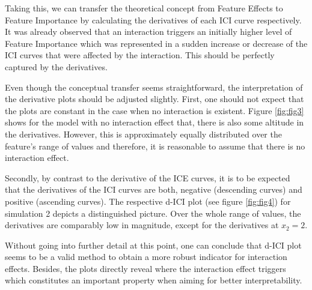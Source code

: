 \documentclass[
]{krantz}
\begin{document}
Taking this, we can transfer the theoretical concept from Feature Effects to Feature Importance by calculating the derivatives of each ICI curve respectively. It was already observed that an interaction triggers an initially higher level of Feature Importance which was represented in a sudden increase or decrease of the ICI curves that were affected by the interaction. This should be perfectly captured by the derivatives.

Even though the conceptual transfer seems straightforward, the interpretation of the derivative plots should be adjusted slightly. First, one should not expect that the plots are constant in the case when no interaction is existent. Figure \ref{fig:fig3} shows for the model with no interaction effect that, there is also some altitude in the derivatives. However, this is approximately equally distributed over the feature's range of values and therefore, it is reasonable to assume that there is no interaction effect.

Secondly, by contrast to the derivative of the ICE curves, it is to be expected that the derivatives of the ICI curves are both, negative (descending curves) and positive (ascending curves). The respective d-ICI plot (see figure \ref{fig:fig4}) for simulation 2 depicts a distinguished picture. Over the whole range of values, the derivatives are comparably low in magnitude, except for the derivatives at \(x_{2} = 2\).

Without going into further detail at this point, one can conclude that d-ICI plot seems to be a valid method to obtain a more robust indicator for interaction effects. Besides, the plots directly reveal where the interaction effect triggers which constitutes an important property when aiming for better interpretability.
\end{document}
